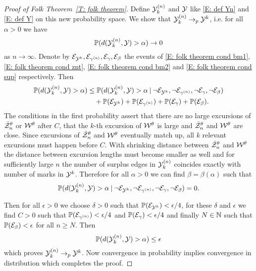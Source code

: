 \begin{proof}[Proof of Folk Theorem~\ref{T: folk theorem}]
	
	Define ${\mathcal{Y}}^{(n)}_k$ and ${\mathcal{Y}}$ like \eqref{E: def Yn} and \eqref{E: def Y} on this new probability space.
	We show that ${\mathcal{Y}}^{(n)}_k \rightarrow_p {\mathcal{Y}}^k$, i.e. for all $\alpha > 0$ we have
	\begin{equation}
		\mathbb{P}( d({\mathcal{Y}}^{(n)}_k, {\mathcal{Y}}) > \alpha) \rightarrow 0
	\end{equation}
	as $n \rightarrow \infty$.
	Denote by $\mathcal{E}_{{\mathcal{Y}}^k}, \mathcal{E}_{\gamma^{(n)}}, \mathcal{E}_{\gamma}, \mathcal{E}_{\beta}$ the events of 
	\eqref{E: folk theorem cond bm1}, \eqref{E: folk theorem cond znt}, \eqref{E: folk theorem cond bm2} and \eqref{E: folk theorem cond sup} respectively.
	Then
	\begin{equation}
		\begin{aligned}
		\mathbb{P}( d({\mathcal{Y}}^{(n)}_k, {\mathcal{Y}}) > \alpha) 
		&\leq \mathbb{P}( d({\mathcal{Y}}^{(n)}_k, {\mathcal{Y}}) > \alpha \: | \: \neg\mathcal{E}_{{\mathcal{Y}}^k}, \neg\mathcal{E}_{\gamma^{(n)}}, \neg\mathcal{E}_{\gamma}, \neg\mathcal{E}_{\beta}) \\
		&\quad + \mathbb{P}(\mathcal{E}_{{\mathcal{Y}}^k}) + \mathbb{P}(\mathcal{E}_{\gamma^{(n)}}) + \mathbb{P}(\mathcal{E}_{\gamma}) + \mathbb{P}(\mathcal{E}_{\beta}). 
		\end{aligned}
	\end{equation}
	The conditions in the first probability assert that there are no large excursions of $\bar{\mathcal{Z}}^{\theta}_n$ or $\mathcal{W}^{\theta}$ after $C$,
	that the $k$-th excursion of $\mathcal{W}^{\theta}$ is large and $\bar{\mathcal{Z}}^{\theta}_n$ and $\mathcal{W}^{\theta}$ are close.
	Since excursions of $\bar{\mathcal{Z}}^{\theta}_n$ and $\mathcal{W}^{\theta}$ eventually match up, 
	all $k$ relevant excursions must happen before $C$.
	With shrinking distance between $\bar{\mathcal{Z}}^{\theta}_n$ and $\mathcal{W}^{\theta}$ the distance between excursion lengths must become smaller as well
	and for sufficiently large $n$ the number of surplus edges in ${\mathcal{Y}}^{(n)}_k$ coincides exactly with number of marks in ${\mathcal{Y}}^k$.
	Therefore for all $\alpha > 0$ we can find $\beta = \beta(\alpha)$ such that
	\begin{equation}
		\mathbb{P}( d({\mathcal{Y}}^{(n)}_k, {\mathcal{Y}}) > \alpha \: | \: \neg\mathcal{E}_{{\mathcal{Y}}^k}, \neg\mathcal{E}_{\gamma^{(n)}}, \neg\mathcal{E}_{\gamma}, \neg\mathcal{E}_{\beta}) = 0.
	\end{equation}
	
	Then for all $\epsilon > 0$ we choose $\delta > 0$ such that $\mathbb{P}(\mathcal{E}_{{\mathcal{Y}}^k}) < \epsilon / 4$,
	for these $\delta$ and $\epsilon$ we find $C > 0$ such that $\mathbb{P}(\mathcal{E}_{\gamma^{(n)}}) < \epsilon / 4$ and $\mathbb{P}(\mathcal{E}_{\gamma}) < \epsilon / 4$
	and finally $N \in \mathbb{N}$ such that $\mathbb{P}(\mathcal{E}_{\beta}) < \epsilon$ for all $n \geq N$.
	Then
	\begin{equation}
		\mathbb{P}( d({\mathcal{Y}}^{(n)}_k, {\mathcal{Y}}) > \alpha) \leq \epsilon
	\end{equation}
	which proves ${\mathcal{Y}}^{(n)}_k \rightarrow_p {\mathcal{Y}}^k$.
	Now convergence in probability implies convergence in distribution which completes the proof.
\end{proof}

